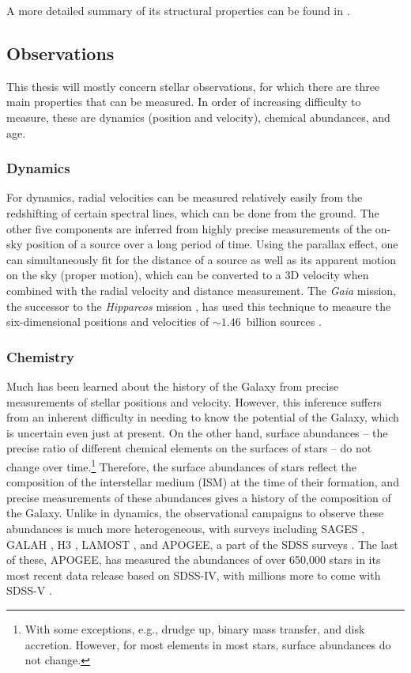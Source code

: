 A more detailed summary of its structural properties can be found in \citet{2016ARA&A..54..529B}.

\subsection{Observations}
This thesis will mostly concern stellar observations, for which there are three main properties that can be measured. In order of increasing difficulty to measure, these are dynamics (position and velocity), chemical abundances, and age.

\subsubsection{Dynamics}
For dynamics, radial velocities can be measured relatively easily from the redshifting of certain spectral lines, which can be done from the ground. The other five components are inferred from highly precise measurements of the on-sky position of a source over a long period of time. Using the parallax effect, one can simultaneously fit for the distance of a source as well as its apparent motion on the sky (proper motion), which can be converted to a 3D velocity when combined with the radial velocity and distance measurement. The \textit{Gaia} mission, the successor to the \textit{Hipparcos} mission \citep{1997ESASP1200.....E}, has used this technique to measure the six-dimensional positions and velocities of $\sim1.46$~billion sources \citep{2023A&A...674A..37G}.

\subsubsection{Chemistry}
Much has been learned about the history of the Galaxy from precise measurements of stellar positions and velocity. However, this inference suffers from an inherent difficulty in needing to know the potential of the Galaxy, which is uncertain even just at present. On the other hand, surface abundances -- the precise ratio of different chemical elements on the surfaces of stars -- do not change over time.\footnote{With some exceptions, e.g., drudge up, binary mass transfer, and disk accretion. However, for most elements in most stars, surface abundances do not change.} Therefore, the surface abundances of stars reflect the composition of the interstellar medium (ISM) at the time of their formation, and precise measurements of these abundances gives a history of the composition of the Galaxy. Unlike in dynamics, the observational campaigns to observe these abundances is much more heterogeneous, with surveys including SAGES \citep{2023ApJS..268....9F}, GALAH \citep{2015MNRAS.449.2604D}, H3 \citep{2019ApJ...883..107C}, LAMOST \citep{2012RAA....12..723Z}, and APOGEE, a part of the SDSS surveys \citep{2017AJ....154...94M}. The last of these, APOGEE, has measured the abundances of over 650,000 stars in its most recent data release based on SDSS-IV, with millions more to come with SDSS-V \citep{2017arXiv171103234K}.

